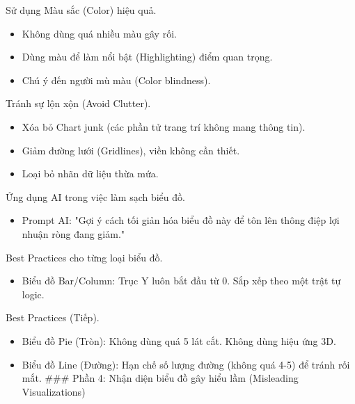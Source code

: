 \documentclass[aspectratio=169]{beamer}
\begin{document}
\begin{frame}{Sử dụng Màu sắc (Color) hiệu quả.}
    \begin{itemize}
        \item Không dùng quá nhiều màu gây rối.
        \item Dùng màu để làm nổi bật (Highlighting) điểm quan trọng.
        \item Chú ý đến người mù màu (Color blindness).
    \end{itemize}
\end{frame}


\begin{frame}{Tránh sự lộn xộn (Avoid Clutter).}
    \begin{itemize}
        \item Xóa bỏ Chart junk (các phần tử trang trí không mang thông tin).
        \item Giảm đường lưới (Gridlines), viền không cần thiết.
        \item Loại bỏ nhãn dữ liệu thừa mứa.
    \end{itemize}
\end{frame}


\begin{frame}{Ứng dụng AI trong việc làm sạch biểu đồ.}
    \begin{itemize}
        \item Prompt AI: "Gợi ý cách tối giản hóa biểu đồ này để tôn lên thông điệp lợi nhuận ròng đang giảm."
    \end{itemize}
\end{frame}


\begin{frame}{Best Practices cho từng loại biểu đồ.}
    \begin{itemize}
        \item Biểu đồ Bar/Column: Trục Y luôn bắt đầu từ 0. Sắp xếp theo một trật tự logic.
    \end{itemize}
\end{frame}


\begin{frame}{Best Practices (Tiếp).}
    \begin{itemize}
        \item Biểu đồ Pie (Tròn): Không dùng quá 5 lát cắt. Không dùng hiệu ứng 3D.
        \item Biểu đồ Line (Đường): Hạn chế số lượng đường (không quá 4-5) để tránh rối mắt.
        ### Phần 4: Nhận diện biểu đồ gây hiểu lầm (Misleading Visualizations)
    \end{itemize}
\end{frame}
\end{document}
